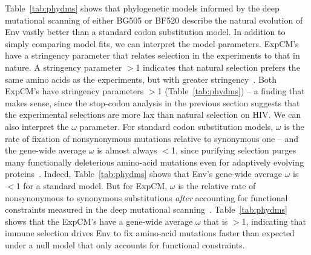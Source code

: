 \documentclass[9pt]{elife}
\begin{document}
Table~\ref{tab:phydms} shows that phylogenetic models informed by the deep mutational scanning of either BG505 or BF520 describe the natural evolution of Env vastly better than a standard codon substitution model.
In addition to simply comparing model fits, we can interpret the model parameters.
ExpCM's have a stringency parameter that relates selection in the experiments to that in nature.
A stringency parameter $>$1 indicates that natural selection prefers the same amino acids as the experiments, but with greater stringency~\citep{hilton2017phydms}.
Both ExpCM's have stringency parameters $>$1 (Table~\ref{tab:phydms}) -- a finding that makes sense, since the stop-codon analysis in the previous section suggests that the experimental selections are more lax than natural selection on HIV.
We can also interpret the $\omega$ parameter.
For standard codon substitution models, $\omega$ is the rate of fixation of nonsynonymous mutations relative to synonymous one -- and the gene-wide average $\omega$ is almost always $<$1, since purifying selection purges many functionally deleterious amino-acid mutations even for adaptively evolving proteins~\citep{murrell2015gene}.
Indeed, Table~\ref{tab:phydms} shows that Env's gene-wide average $\omega$ is $<$1 for a standard model.
But for ExpCM, $\omega$ is the relative rate of nonsynonymous to synonymous substitutions \emph{after} accounting for functional constraints measured in the deep mutational scanning~\citep{bloom2017identification}.
Table~\ref{tab:phydms} shows that the ExpCM's have a gene-wide average $\omega$ that is $>$1, indicating that immune selection drives Env to fix amino-acid mutations faster than expected under a null model that only accounts for functional constraints.
\end{document}
